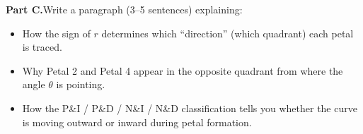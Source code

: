 \documentclass[10pt]{article}
\begin{document}
\begin{tcolorbox}[colback=white, colframe=black!40,
    title=\textbf{Tier E --- Extend},
    fonttitle=\bfseries, arc=2mm, left=3mm, right=3mm, top=2mm, bottom=2mm]
\vspace{8pt}
\textbf{Part C.}\quad Write a paragraph (3--5 sentences) explaining:
\begin{itemize}[leftmargin=1.4em, itemsep=2pt]
  \item How the sign of $r$ determines which ``direction'' (which quadrant)
    each petal is traced.
  \item Why Petal 2 and Petal 4 appear in the opposite quadrant from where
    the angle $\theta$ is pointing.
  \item How the P\&I / P\&D / N\&I / N\&D classification tells you whether
    the curve is moving outward or inward during petal formation.
\end{itemize}


\end{tcolorbox}
\end{document}
